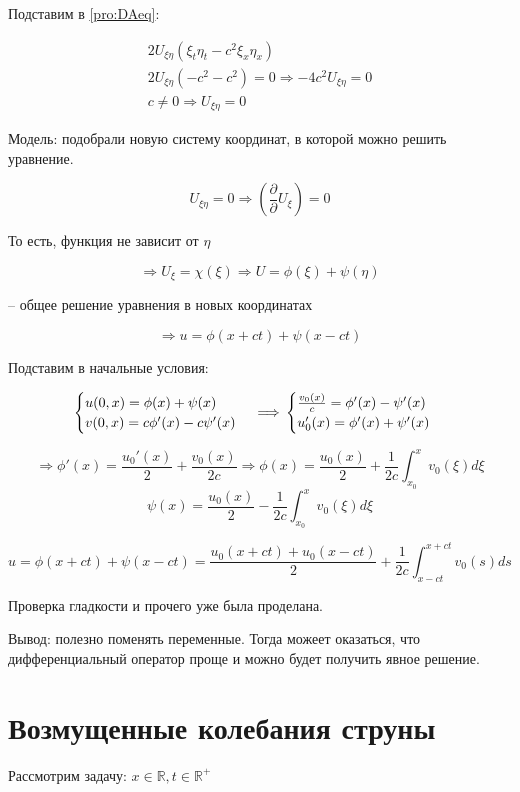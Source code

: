 \documentclass[12pt]{report}
\begin{document}
Подставим в \eqref{pro:DAeq}: 

$$
    \begin{gathered}
        2U_{\xi \eta} (\xi_t \eta_t - c ^ 2 \xi_x \eta_x)
        \\
        2 U_{\xi \eta} (-c ^ 2 - c ^ 2) = 0 \Longrightarrow -4c ^ 2 U_{\xi \eta} = 0
        \\
        c \neq 0 \Longrightarrow U_{\xi \eta} = 0
    \end{gathered}
$$

Модель: подобрали новую систему координат, в которой можно решить уравнение. 

$$U_{\xi \eta} = 0 \Longrightarrow (\frac{\partial}{\partial} U_\xi) = 0$$

То есть, функция не зависит от $\eta$

$$\Longrightarrow U_\xi = \chi(\xi) \Longrightarrow U = \phi(\xi) + \psi(\eta)$$

-- общее решение уравнения в новых координатах

$$\Longrightarrow u = \phi(x + ct) + \psi(x - ct)$$

Подставим в начальные условия: 

\[
    \begin{cases}
        u(0, x) = \phi(x) + \psi(x)
        \\
        v(0, x) = c \phi ' (x) - c \psi ' (x)
    \end{cases}
    \\
    \Longrightarrow 
    \\
    \begin{cases}
        \frac{v_0(x)}{c} = \phi' (x) - \psi' (x)
        \\
        u_0' (x) = \phi' (x) + \psi' (x)
    \end{cases}
\]

$$\Longrightarrow \phi'(x) = \frac{u_0'(x)}{2} + \frac{v_0(x)}{2c} \Longrightarrow \phi(x) = \frac{u_0(x)}{2} + \frac{1}{2c} \int^{x}_{x_0}{v_0(\xi)d\xi}$$
$$\psi(x) = \frac{u_0(x)}{2} - \frac{1}{2c} \int^{x}_{x_0}{v_0(\xi)d\xi}$$

$$u = \phi(x + ct) + \psi(x - ct) = \frac{u_0(x+ct) + u_0(x - ct)}{2} + \frac{1}{2c} \int^{x + ct}_{x - ct}{v_0(s) ds}$$

Проверка гладкости и прочего уже была проделана. 

Вывод: полезно поменять переменные. Тогда можеет оказаться, что дифференциальный оператор проще и можно будет получить явное решение. 

\section{Возмущенные колебания струны}
Рассмотрим задачу: $x \in \mathbb{R}, t \in \mathbb{R} ^ +$
\end{document}
